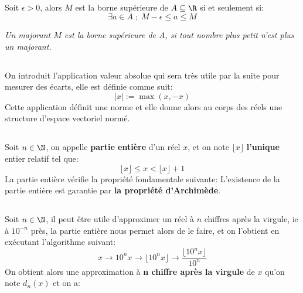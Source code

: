 \subsection*{}
Soit \(\epsilon > 0\), alors \(M\) est la borne supérieure de \(A \subseteq \R\) si et seulement si:  
\[
   \exists a \in A \; ; \; M - \epsilon \leq a \leq M
\]

\begin{center}
    \textit{
        Un majorant \(M\) est la borne supérieure de \(A\), si tout nombre plus petit n'est plus un majorant.
    }
\end{center}
\subsection*{}
On introduit l'application valeur absolue qui sera très utile par la suite pour mesurer des écarts, elle est définie comme suit:
\[
    |x| := \max(x, -x)
\]
Cette application définit une norme et elle donne alors au corps des réels une structure d'espace vectoriel normé.
\subsection*{}
Soit \(n \in \N\), on appelle \textbf{partie entière} d'un réel \(x\), et on note \(\lfloor x \rfloor\) \textbf{l'unique} entier relatif tel que:
\[
    \lfloor x \rfloor \leq x < \lfloor x \rfloor + 1
\]
La partie entière vérifie la propriété fondamentale suivante:
L'existence de la partie entière est garantie par \textbf{la propriété d'Archimède}.
\subsection*{}
Soit \(n \in \N\), il peut être utile d'approximer un réel à \(n\) chiffres après la virgule, ie à \(10^{-n}\) près, la partie entière nous permet alors de le faire, et on l'obtient en exécutant l'algorithme suivant:
\[
    x \longrightarrow 10^n x \longrightarrow \lfloor 10^n x \rfloor \longrightarrow \frac{\lfloor 10^n x \rfloor}{10^n}
\]
On obtient alors une approximation à \textbf{n chiffre après la virgule} de \(x\) qu'on note \(d_n(x)\) et on a:
